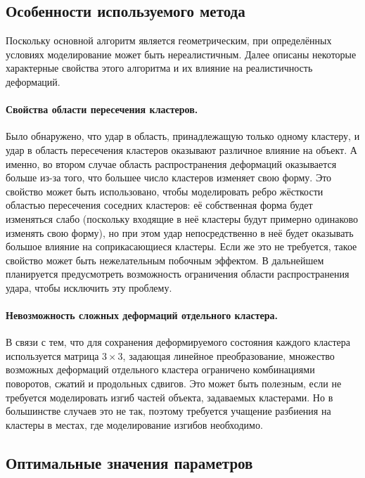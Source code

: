\documentclass[a4paper, 14pt, titlepage]{extarticle}
\begin{document}
    \subsection{Особенности используемого метода}\label{ssec:special_features}

      Поскольку основной алгоритм является геометрическим, при определённых условиях моделирование
      может быть нереалистичным. Далее описаны некоторые характерные свойства этого алгоритма и их
      влияние на реалистичность деформаций.

      \paragraph{Свойства области пересечения кластеров.} Было обнаружено, что удар в область,
      принадлежащую только одному кластеру, и удар в область пересечения кластеров оказывают
      различное влияние на объект. А именно, во втором случае область распространения деформаций
      оказывается больше из-за того, что большее число кластеров изменяет свою форму. Это свойство
      может быть использовано, чтобы моделировать ребро жёсткости областью пересечения соседних
      кластеров: её собственная форма будет изменяться слабо (поскольку входящие в неё кластеры
      будут примерно одинаково изменять свою форму), но при этом удар непосредственно в неё будет
      оказывать большое влияние на соприкасающиеся кластеры. Если же это не требуется, такое
      свойство может быть нежелательным побочным эффектом. В дальнейшем планируется предусмотреть
      возможность ограничения области распространения удара, чтобы исключить эту проблему.

      \paragraph{Невозможность сложных деформаций отдельного кластера.} В связи с тем, что для сохранения
      деформируемого состояния каждого кластера используется матрица $3 \times 3$, задающая
      линейное преобразование, множество возможных деформаций отдельного кластера ограничено комбинациями
      поворотов, сжатий и продольных сдвигов. Это может быть полезным, если не требуется
      моделировать изгиб частей объекта, задаваемых кластерами. Но в большинстве случаев это не
      так, поэтому требуется учащение разбиения на кластеры в местах, где моделирование
      изгибов необходимо.

    \subsection{Оптимальные значения параметров}\label{ssec:optimal_parameters}
\end{document}
